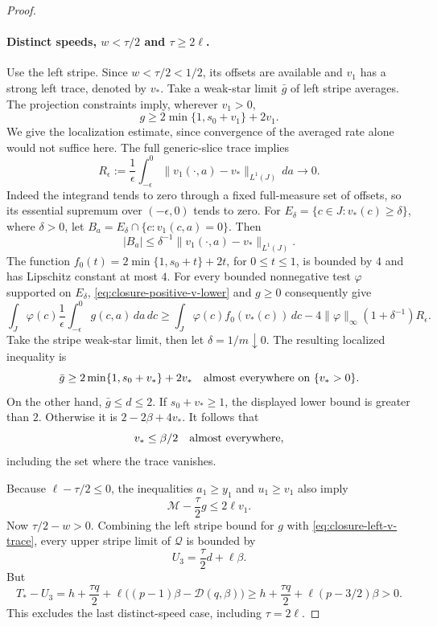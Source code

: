 \begin{proof}
\paragraph{Distinct speeds, \(w<\tau/2\) and \(\tau\ge2\ell\).}
Use the left stripe.  Since \(w<\tau/2<1/2\), its offsets are
available and \(v_1\) has a strong left trace, denoted by \(v_*\).
Take a weak-star limit \(\bar g\) of left stripe averages.  The
projection constraints imply, wherever \(v_1>0\),
\begin{equation}
  g\ge2\min\{1,s_0+v_1\}+2v_1.
  \label{eq:closure-positive-v-lower}
\end{equation}
We give the localization estimate, since convergence of the averaged rate
alone would not suffice here.  The full generic-slice trace implies
\begin{equation}
 R_\epsilon:=\frac1\epsilon\int_{-\epsilon}^0
       \|v_1(\cdot,a)-v_*\|_{L^1(J)}\,da\longrightarrow0.
 \label{eq:closure-mixed-trace-error}
\end{equation}
Indeed the integrand tends to zero through a fixed full-measure set of
offsets, so its essential supremum over \((-\epsilon,0)\) tends to zero.
For \(E_\delta=\{c\in J:v_*(c)\ge\delta\}\), where \(\delta>0\), let
\(B_a=E_\delta\cap\{c:v_1(c,a)=0\}\).  Then
\begin{equation}
 |B_a|\le\delta^{-1}\|v_1(\cdot,a)-v_*\|_{L^1(J)}.
 \label{eq:closure-bad-zero-set}
\end{equation}
The function \(f_0(t)=2\min\{1,s_0+t\}+2t\), for \(0\le t\le1\),
is bounded by \(4\) and has Lipschitz constant at most \(4\).
For every bounded nonnegative test \(\varphi\) supported on \(E_\delta\),
\eqref{eq:closure-positive-v-lower} and \(g\ge0\) consequently give
\[
 \int_J\varphi(c)\frac1\epsilon\int_{-\epsilon}^0g(c,a)\,da\,dc
 \ge \int_J\varphi(c)f_0(v_*(c))\,dc
       -4\|\varphi\|_\infty(1+\delta^{-1})R_\epsilon.
\]
Take the stripe weak-star limit, then let \(\delta=1/m\downarrow0\).
The resulting localized inequality is
\[
  \bar g\ge2\min\{1,s_0+v_*\}+2v_*
  \quad\hbox{almost everywhere on }\{v_*>0\}.
\]
On the other hand, \(\bar g\le d\le2\).  If \(s_0+v_*\ge1\), the
displayed lower bound is greater than \(2\).  Otherwise it is
\(2-2\beta+4v_*\).  It follows that
\begin{equation}
  v_*\le\beta/2\quad\hbox{almost everywhere},
  \label{eq:closure-left-v-trace}
\end{equation}
including the set where the trace vanishes.

Because \(\ell-\tau/2\le0\), the inequalities \(a_1\ge y_1\) and
\(u_1\ge v_1\) also imply
\[
  \mathcal M-\frac\tau2g\le2\ell v_1.
\]
Now \(\tau/2-w>0\).  Combining the left stripe bound for \(g\) with
\eqref{eq:closure-left-v-trace}, every upper stripe limit of
\(\mathcal Q\) is bounded by
\[
  U_3=\frac\tau2d+\ell\beta.
\]
But
\[
  T_*-U_3
   =h+\frac{\tau q}{2}
       +\ell\bigl((p-1)\beta-\mathcal D(q,\beta)\bigr)
   \ge h+\frac{\tau q}{2}+\ell(p-3/2)\beta>0.
\]
This excludes the last distinct-speed case, including \(\tau=2\ell\).


\end{proof}
